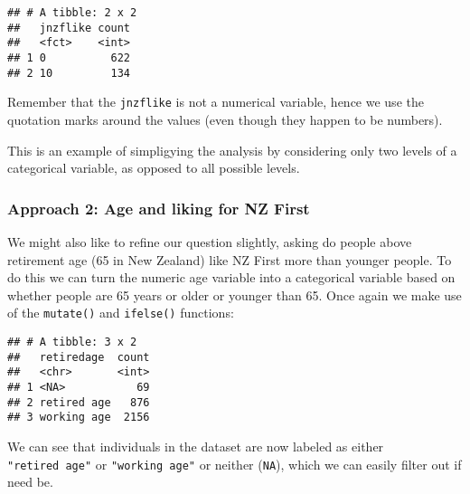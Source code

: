 \documentclass[]{article}
\newenvironment{Shaded}{\begin{snugshade}}{\end{snugshade}}
\newcommand{\KeywordTok}[1]{\textcolor[rgb]{0.13,0.29,0.53}{\textbf{#1}}}
\newcommand{\DataTypeTok}[1]{\textcolor[rgb]{0.13,0.29,0.53}{#1}}
\newcommand{\DecValTok}[1]{\textcolor[rgb]{0.00,0.00,0.81}{#1}}
\newcommand{\StringTok}[1]{\textcolor[rgb]{0.31,0.60,0.02}{#1}}
\newcommand{\OperatorTok}[1]{\textcolor[rgb]{0.81,0.36,0.00}{\textbf{#1}}}
\newcommand{\NormalTok}[1]{#1}
\begin{document}
\begin{verbatim}
## # A tibble: 2 x 2
##   jnzflike count
##   <fct>    <int>
## 1 0          622
## 2 10         134
\end{verbatim}

Remember that the \texttt{jnzflike} is not a numerical variable, hence
we use the quotation marks around the values (even though they happen to
be numbers).

This is an example of simpligying the analysis by considering only two
levels of a categorical variable, as opposed to all possible levels.

\subsubsection{Approach 2: Age and liking for NZ
First}\label{approach-2-age-and-liking-for-nz-first}

We might also like to refine our question slightly, asking do people
above retirement age (65 in New Zealand) like NZ First more than younger
people. To do this we can turn the numeric age variable into a
categorical variable based on whether people are 65 years or older or
younger than 65. Once again we make use of the \texttt{mutate()} and
\texttt{ifelse()} functions:

\begin{Shaded}
\end{Shaded}

\begin{verbatim}
## # A tibble: 3 x 2
##   retiredage  count
##   <chr>       <int>
## 1 <NA>           69
## 2 retired age   876
## 3 working age  2156
\end{verbatim}

We can see that individuals in the dataset are now labeled as either
\texttt{"retired\ age"} or \texttt{"working\ age"} or neither
(\texttt{NA}), which we can easily filter out if need be.
\end{document}
